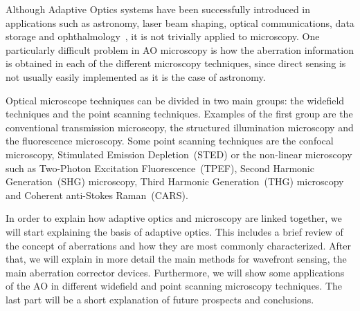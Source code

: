Although Adaptive Optics systems have been successfully introduced in applications such as astronomy, laser beam shaping, optical communications, data storage and ophthalmology~\cite{AOM_biomedical}, it is not trivially applied to microscopy. One particularly difficult problem in AO microscopy is how the aberration information is obtained in each of the different microscopy techniques, since direct sensing is not usually easily implemented as it is the case of astronomy.

Optical microscope techniques can be divided in two main groups: the widefield techniques and the point scanning techniques. Examples of the first group are the conventional transmission microscopy, the structured illumination microscopy and the fluorescence microscopy. Some point scanning techniques are the confocal microscopy, Stimulated Emission Depletion~(STED) or the non-linear microscopy such as Two-Photon Excitation Fluorescence~(TPEF), Second Harmonic Generation~(SHG) microscopy, Third Harmonic Generation~(THG) microscopy and Coherent anti-Stokes Raman~(CARS). \newline

In order to explain how adaptive optics and microscopy are linked together, we will start explaining the basis of adaptive optics. This includes a brief review of the concept of aberrations and how they are most commonly characterized. After that, we will explain in more detail the main methods for wavefront sensing, the main aberration corrector devices. Furthermore, we will show some applications of the AO in different widefield and point scanning microscopy techniques. The last part will be a short explanation of future prospects and conclusions.       
